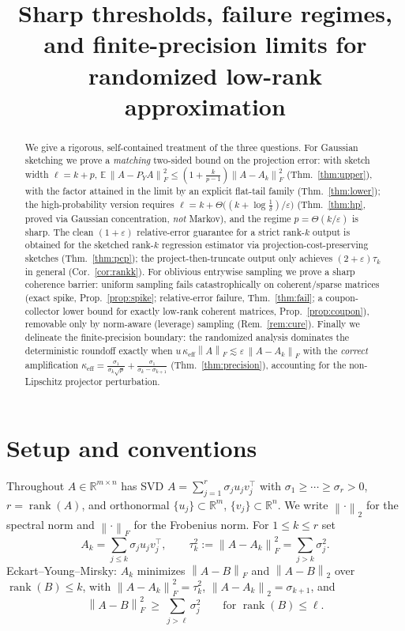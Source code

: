 \documentclass{amsart}
\theoremstyle{definition}
\DeclareMathOperator{\rank}{rank}
\newcommand{\R}{\mathbb{R}}
\newcommand{\Frob}[1]{\left\lVert #1\right\rVert_F}
\newcommand{\Op}[1]{\left\lVert #1\right\rVert_2}
\newcommand{\E}{\mathbb{E}}
\begin{document}
\title{Sharp thresholds, failure regimes, and finite-precision limits for
randomized low-rank approximation}
\maketitle

\begin{abstract}
We give a rigorous, self-contained treatment of the three questions. For
Gaussian sketching we prove a \emph{matching} two-sided bound on the projection
error: with sketch width $\ell=k+p$,
$\E\,\Frob{A-P_YA}^2\le(1+\tfrac{k}{p-1})\Frob{A-A_k}^2$
(Thm.~\ref{thm:upper}), with the factor attained in the limit by an explicit
flat-tail family (Thm.~\ref{thm:lower}); the high-probability version requires
$\ell=k+\Theta\big((k+\log\tfrac1\delta)/\varepsilon\big)$
(Thm.~\ref{thm:hp}, proved via Gaussian concentration, \emph{not} Markov), and
the regime $p=\Theta(k/\varepsilon)$ is sharp. The clean $(1+\varepsilon)$
relative-error guarantee for a strict rank-$k$ output is obtained for the
sketched rank-$k$ regression estimator via projection-cost-preserving sketches
(Thm.~\ref{thm:pcp}); the project-then-truncate output only achieves
$(2+\varepsilon)\tau_k$ in general (Cor.~\ref{cor:rankk}). For oblivious
entrywise sampling we prove a sharp coherence barrier: uniform sampling fails
catastrophically on coherent/sparse matrices (exact spike,
Prop.~\ref{prop:spike}; relative-error failure, Thm.~\ref{thm:fail}; a
coupon-collector lower bound for exactly low-rank coherent matrices,
Prop.~\ref{prop:coupon}), removable only by norm-aware (leverage) sampling
(Rem.~\ref{rem:cure}). Finally we delineate the finite-precision boundary: the
randomized analysis dominates the deterministic roundoff exactly when
$u\,\kappa_{\mathrm{eff}}\Frob{A}\lesssim\varepsilon\,\Frob{A-A_k}$ with the
\emph{correct} amplification
$\kappa_{\mathrm{eff}}=\frac{\sigma_1}{\sigma_k\sqrt p}+\frac{\sigma_1}{\sigma_k-\sigma_{k+1}}$
(Thm.~\ref{thm:precision}), accounting for the non-Lipschitz projector
perturbation.
\end{abstract}

\section{Setup and conventions}\label{sec:setup}

Throughout $A\in\R^{m\times n}$ has SVD $A=\sum_{j=1}^{r}\sigma_j u_j v_j^{\top}$
with $\sigma_1\ge\cdots\ge\sigma_r>0$, $r=\rank(A)$, and orthonormal
$\{u_j\}\subset\R^m$, $\{v_j\}\subset\R^n$. We write $\Op{\cdot}$ for the
spectral norm and $\Frob{\cdot}$ for the Frobenius norm. For $1\le k\le r$ set
\begin{equation}\label{eq:partition}
A_k=\sum_{j\le k}\sigma_j u_j v_j^\top,\qquad
\tau_k^2:=\Frob{A-A_k}^2=\sum_{j>k}\sigma_j^2 .
\end{equation}
Eckart--Young--Mirsky: $A_k$ minimizes $\Frob{A-B}$ and $\Op{A-B}$ over
$\rank(B)\le k$, with $\Frob{A-A_k}^2=\tau_k^2$, $\Op{A-A_k}=\sigma_{k+1}$, and
\begin{equation}\label{eq:EY}
\Frob{A-B}^2\ \ge\ \sum_{j>\ell}\sigma_j^2\qquad\text{for }\rank(B)\le\ell.
\end{equation}
\end{document}
